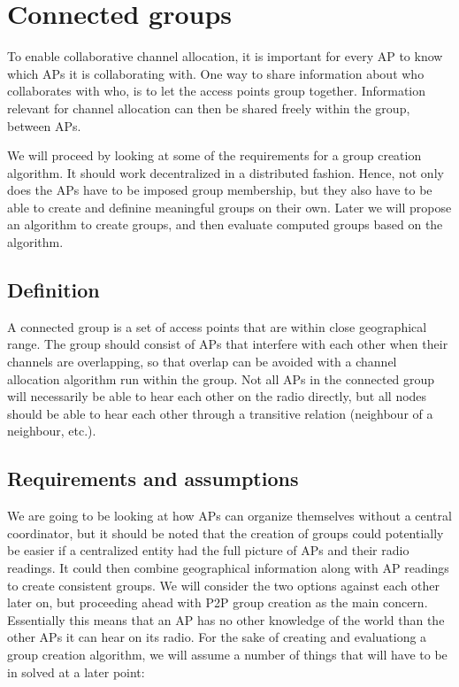 \chapter{Connected groups}
To enable collaborative channel allocation, it is
important for every AP to know which APs it is collaborating with.
One way to share information about who collaborates with who,
is to let the access points group together. Information relevant for channel
allocation can then be shared freely within the group, between APs.

We will proceed by looking at some of the requirements for a group creation algorithm.
It should work decentralized in a distributed fashion. Hence, not only does the APs have to
be imposed group membership, but they also have to be able to create and definine
meaningful groups on their own. Later we will propose an algorithm to create groups,
and then evaluate computed groups based on the algorithm.


\section{Definition}
A connected group is a set of access points that are within close geographical range.
The group should consist of APs that interfere with each other when their channels are overlapping, so that overlap can be avoided with a channel allocation algorithm run within the group. Not all APs in
the connected group will necessarily be able to hear each other on the radio directly, but all nodes
should be able to hear each other through a transitive relation (neighbour of a neighbour, etc.).

\section{Requirements and assumptions}
We are going to be looking at how APs can organize themselves without a central coordinator,
but it should be noted that the creation of groups could potentially be easier if
a centralized entity had the full picture of APs and their radio readings.
It could then combine geographical information along with AP readings to create consistent groups.
We will consider the two options against each other later on,
but proceeding ahead with P2P group creation as the main concern. 
Essentially this means that an AP has no other knowledge of the world than the other APs
it can hear on its radio. For the sake of creating and evaluationg a group creation algorithm,
we will assume a number of things that will have to be in solved at a later point:

